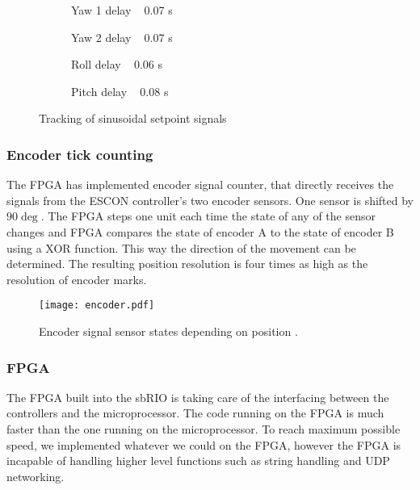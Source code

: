 \begin{figure}
	\begin{subfigure}[b]{0.5\textwidth}
		\centering
		\resizebox{\linewidth}{!}{
			
		}
		\caption{Yaw 1 delay ~ 0.07 s}
	\end{subfigure}
	\begin{subfigure}[b]{0.5\textwidth}
		\centering
		\resizebox{\linewidth}{!}{
			
		}
		\caption{Yaw 2 delay ~ 0.07 s}
	\end{subfigure}
	\begin{subfigure}[b]{0.5\textwidth}
		\centering
		\resizebox{\linewidth}{!}{
			
		}
		\caption{Roll delay ~ 0.06 s}
	\end{subfigure}
	\begin{subfigure}[b]{0.5\textwidth}
		\centering
		\resizebox{\linewidth}{!}{
			
		}
		\caption{Pitch delay ~ 0.08 s}
	\end{subfigure}
	\caption{Tracking of sinusoidal setpoint signals}
	\label{sin_excite}
\end{figure}

\subsubsection{Encoder tick counting}\label{encount}
The FPGA has implemented encoder signal counter, that directly receives the signals from  the ESCON controller's two encoder sensors. One sensor is shifted by $90\deg$. The FPGA steps one unit each time the state of any of the sensor changes and FPGA compares the state of encoder A to the state of encoder B using a XOR function. This way the direction of the movement can be determined. The resulting position resolution is four times as high as the resolution of encoder marks.

\begin{figure}[H]
	\centering
	\texttt{[image: encoder.pdf]}
	\caption{Encoder signal sensor states depending on position \cite{motor_encoder}.}
	\label{fig:encoder}
\end{figure}

\subsubsection{FPGA}

The FPGA built into the sbRIO is taking care of the interfacing between the controllers and the microprocessor. The code running on the FPGA is much faster than the one running on the microprocessor. To reach maximum possible speed, we implemented whatever we could on the FPGA, however the FPGA is incapable of handling higher level functions such as string handling and UDP networking.

